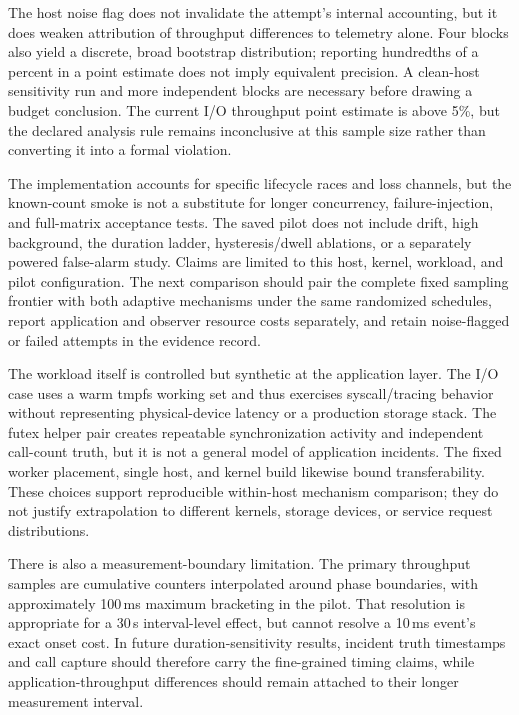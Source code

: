 \documentclass[conference]{IEEEtran}
\begin{document}
The host noise flag does not invalidate the attempt's internal accounting, but it does weaken attribution of throughput differences to telemetry alone. Four blocks also yield a discrete, broad bootstrap distribution; reporting hundredths of a percent in a point estimate does not imply equivalent precision. A clean-host sensitivity run and more independent blocks are necessary before drawing a budget conclusion. The current I/O throughput point estimate is above 5\%, but the declared analysis rule remains inconclusive at this sample size rather than converting it into a formal violation.

The implementation accounts for specific lifecycle races and loss channels, but the known-count smoke is not a substitute for longer concurrency, failure-injection, and full-matrix acceptance tests. The saved pilot does not include drift, high background, the duration ladder, hysteresis/dwell ablations, or a separately powered false-alarm study. Claims are limited to this host, kernel, workload, and pilot configuration. The next comparison should pair the complete fixed sampling frontier with both adaptive mechanisms under the same randomized schedules, report application and observer resource costs separately, and retain noise-flagged or failed attempts in the evidence record.

The workload itself is controlled but synthetic at the application layer. The I/O case uses a warm tmpfs working set and thus exercises syscall/tracing behavior without representing physical-device latency or a production storage stack. The futex helper pair creates repeatable synchronization activity and independent call-count truth, but it is not a general model of application incidents. The fixed worker placement, single host, and kernel build likewise bound transferability. These choices support reproducible within-host mechanism comparison; they do not justify extrapolation to different kernels, storage devices, or service request distributions.

There is also a measurement-boundary limitation. The primary throughput samples are cumulative counters interpolated around phase boundaries, with approximately 100\,ms maximum bracketing in the pilot. That resolution is appropriate for a 30\,s interval-level effect, but cannot resolve a 10\,ms event's exact onset cost. In future duration-sensitivity results, incident truth timestamps and call capture should therefore carry the fine-grained timing claims, while application-throughput differences should remain attached to their longer measurement interval.
\end{document}
